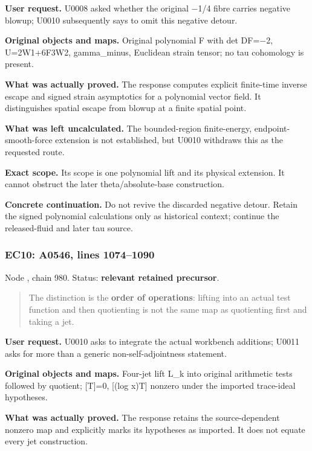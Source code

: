 \documentclass[10pt,a4paper,oneside]{report}
\begin{document}
\textbf{User request.} U0008 asked whether the original
\allowbreak{}\ensuremath{−}\allowbreak{}1/4 fibre carries negative
blowup; U0010 subsequently says to omit this negative detour.

\textbf{Original objects and maps.} Original polynomial F with det
DF=\allowbreak{}\ensuremath{−}\allowbreak{}2, U=2W1+6F3W2, gamma\_minus,
Euclidean strain tensor; no tau cohomology is present.

\textbf{What was actually proved.} The response computes explicit
finite-time inverse escape and signed strain asymptotics for a
polynomial vector field. It distinguishes spatial escape from blowup at
a finite spatial point.

\textbf{What was left uncalculated.} The bounded-region finite-energy,
endpoint-smooth-force extension is not established, but U0010 withdraws
this as the requested route.

\textbf{Exact scope.} Its scope is one polynomial lift and its physical
extension. It cannot obstruct the later theta/absolute-base
construction.

\textbf{Concrete continuation.} Do not revive the discarded negative
detour. Retain the signed polynomial calculations only as historical
context; continue the released-fluid and later tau source.

\subsubsection{EC10: A0546, lines
1074--1090}\label{ec10-a0546-lines-10741090}

Node \protect{}, chain 980.
Status: \textbf{relevant retained precursor}.

\begin{quote}
The distinction is the \textbf{order of operations}: lifting into an
actual test function and then quotienting is not the same map as
quotienting first and taking a jet.
\end{quote}

\textbf{User request.} U0010 asks to integrate the actual workbench
additions; U0011 asks for more than a generic non-self-adjointness
statement.

\textbf{Original objects and maps.} Four-jet lift L\_k into original
arithmetic tests followed by quotient; {[}T{]}=0, {[}(log x)T{]} nonzero
under the imported trace-ideal hypotheses.

\textbf{What was actually proved.} The response retains the
source-dependent nonzero map and explicitly marks its hypotheses as
imported. It does not equate every jet construction.
\end{document}
